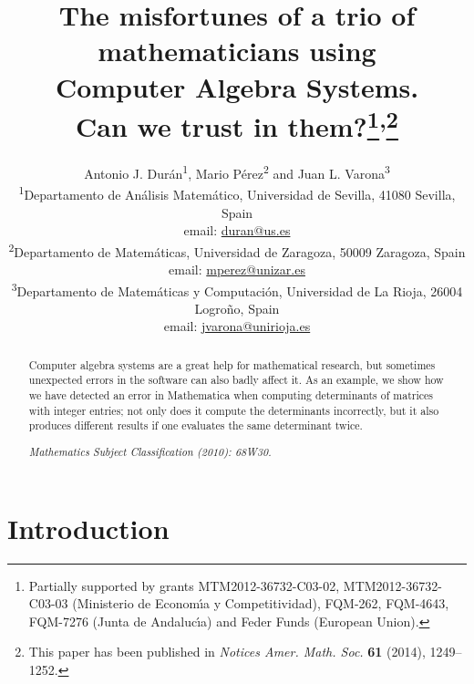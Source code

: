 \documentclass[12pt]{article}
\begin{document}
\title{The misfortunes of a trio of mathematicians using\\Computer Algebra Systems.\\Can we trust in them?\thanks{Partially supported by grants MTM2012-36732-C03-02, MTM2012-36732-C03-03 (Ministerio de Econom\'{\i}a y Competitividad), FQM-262, FQM-4643, FQM-7276 (Junta de Andaluc\'{\i}a) and Feder Funds (European Union).}\textsuperscript{\enspace,}\thanks{This paper has been published in \textit{Notices Amer\@. Math\@. Soc\@.} \textbf{61} (2014), 1249--1252.}}

\author{Antonio J. Dur\'an\textsuperscript{1}, Mario P\'erez\textsuperscript{2} and Juan L. Varona\textsuperscript{3}\\[6pt]
\small\textsuperscript{1}Departamento de An\'alisis Matem\'atico,
Universidad de Sevilla, 41080 Sevilla, Spain\\[-2pt]
\small email: \url{duran@us.es}\\[6pt]
\small\textsuperscript{2}Departamento de Matem\'aticas,
Universidad de Zaragoza, 50009 Zaragoza, Spain\\[-2pt]
\small email: \url{mperez@unizar.es}\\[6pt]
\small\textsuperscript{3}Departamento de Matem\'aticas y Computaci\'on,
Universidad de La Rioja, 26004 Logro\~no, Spain\\[-2pt]
\small email: \url{jvarona@unirioja.es}}

\date{}

\maketitle


\begin{abstract}
Computer algebra systems are a great help for mathematical research, but sometimes
unexpected errors in the software can also badly affect it. As an example, we show how we have detected an error in Mathematica when computing determinants of matrices with integer entries; not only does it compute the determinants incorrectly, but it also produces different results if one evaluates the same determinant twice.

\bigskip

\textit{Mathematics Subject Classification (2010): 68W30.}
\end{abstract}

\section*{Introduction}
\end{document}
